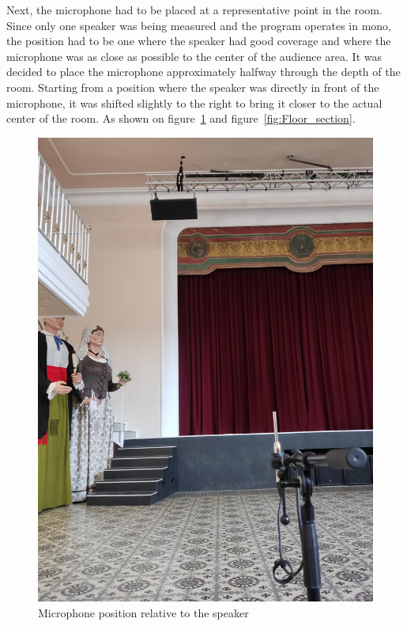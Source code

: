 Next, the microphone had to be placed at a representative point in the room. Since only one speaker was being measured and the program operates in mono, the position had to be one where the speaker had good coverage and where the microphone was as close as possible to the center of the audience area. It was decided to place the microphone approximately halfway through the depth of the room. Starting from a position where the speaker was directly in front of the microphone, it was shifted slightly to the right to bring it closer to the actual center of the room. As shown on figure~\ref{fig:Mic_pos3} and figure~\ref{fig:Floor_section}.
\begin{figure}[H]
	\centering
	\includegraphics[width=0.8
	\linewidth]{Figures/Coro_micpos3.jpeg}
	\caption{Microphone position relative to the speaker}
	\label{fig:Mic_pos3}
\end{figure}

